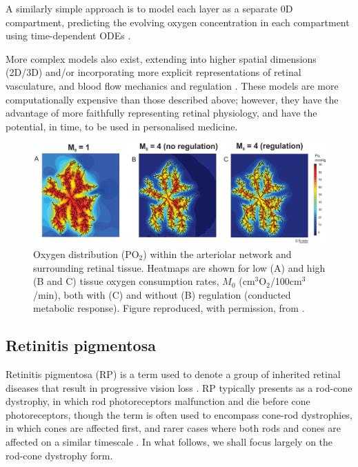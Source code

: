 \documentclass{article}
\begin{document}
A similarly simple approach is to model each layer as a separate 0D compartment, predicting the evolving oxygen concentration in each compartment using time-dependent ODEs \citep[see][who also model nitric oxide concentrations]{German_et_al_2021}.

More complex models also exist, extending into higher spatial dimensions (2D/3D) and/or incorporating more explicit representations of retinal vasculature, and blood flow mechanics and regulation \citep[see Figure \ref{Fig_Fry2020},][see also Section \ref{Sec_nnAMD} for models relevant to nnAMD]{Aquah_et_al_2021,Arciero_et_al_2021,Causin_2015,Friedland_1978,Fry_et_al_2018,Fry_et_al_2020,Linsenmeier_and_Zhang_2017,McDougall_et_al_2012,Watson_et_al_2012}. These models are more computationally expensive than those described above; however, they have the advantage of more faithfully representing retinal physiology, and have the potential, in time, to be used in personalised medicine.
%
\begin{figure}
\begin{center}
\includegraphics[scale=0.95]{Fry_et_al_2020_Fig_3_ABC}
\end{center}
\caption{Oxygen distribution (PO$_2$) within the arteriolar network and surrounding retinal tissue. Heatmaps are shown for low (A) and high (B and C) tissue oxygen consumption rates, $M_0$ (cm$^3$O$_2$/100cm$^3$/min), both with (C) and without (B) regulation (conducted metabolic response). Figure reproduced, with permission, from \citet{Fry_et_al_2020}.}
\label{Fig_Fry2020}
\end{figure}
%
%
\subsection{Retinitis pigmentosa}\label{Sec_RP}
%
Retinitis pigmentosa (RP) is a term used to denote a group of inherited retinal diseases that result in progressive vision loss \citep{Hamel_2006,Hartong_et_al_2006}. RP typically presents as a rod-cone dystrophy, in which rod photoreceptors malfunction and die before cone photoreceptors, though the term is often used to encompass cone-rod dystrophies, in which cones are affected first, and rarer cases where both rods and cones are affected on a similar timescale \citep{Hamel_2006,Hartong_et_al_2006}. In what follows, we shall focus largely on the rod-cone dystrophy form.
\end{document}
